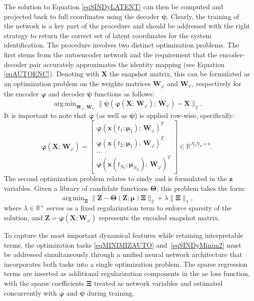 \documentclass[reqno]{amsart}[standalone]
\theoremstyle{definition}
\theoremstyle{remark}
\newcommand{\R}{\mathbb{R}}
\newcommand{\bs}{\boldsymbol}
\DeclareMathOperator*{\argmin}{\arg\,\min}
\begin{document}
The solution to Equation \eqref{eqSINDyLATENT} can then be computed and projected back to full coordinates using the decoder $\bs{\psi}$.
Clearly, the training of the network is a key part of the procedure and should be addressed with the right strategy to return the correct set of latent coordinates for the system identification. The procedure involves two distinct optimization problems. The first stems from the autoencoder network and the requirement that the encoder-decoder pair accurately approximates the identity mapping (see Equation \eqref{eqAUTOENC}). Denoting with $\bs{X}$ the snapshot matrix, this can be formulated as an optimization problem on the weights matrices $\bs{W}_\varphi$ and $\bs{W}_\psi$, respectively for the encoder $\bs{\varphi}$ and decoder $\bs{\psi}$ functions as follows:
\begin{equation}\label{eqMINIMIZAUTO}
\argmin_{\bs{W}_\varphi, \bs{W}_\psi}\| \bs{\psi}\left(\bs{\varphi}(\bs{X};\,\bs{W}_\varphi);\,\bs{W}_\psi\right)-\bs{X}\|_2.
\end{equation}
%
It is important to note that $\bs{\varphi}$ (as well as $\bs{\psi}$) is applied row-wise, specifically:
\begin{equation*}
    \bs{\varphi}(\bs{X};\,\bs{W}_\varphi) =
    \begin{bmatrix}
        \bs{\varphi}(\bs{x}(t_1; \bs{\mu}_1);\, \bs{W}_\varphi)^T \\
        \bs{\varphi}(\bs{x}(t_2; \bs{\mu}_1);\, \bs{W}_\varphi)^T\\
        \dots \\
        \bs{\varphi}(\bs{x}(t_{N_t}; \bs{\mu}_{N_\mu});\,
        \bs{W}_\varphi)^T
   \end{bmatrix}\in\R^{N_tN_\mu\times n}.
\end{equation*}
The second optimization problem relates to \gls{sindy} and is formulated in the $\bs{z}$ variables. Given a library of candidate functions $\bs{\Theta}$, this problem takes the form:
\begin{equation}\label{eqSINDyMinim2}
\argmin_{\bs{\Xi}} \|\dot{\bs{Z}}-\bs{\Theta}(\bs{Z};\bs{\mu})\bs{\Xi}  \|_2 + \lambda \|\bs{\Xi}\|_1,
\end{equation}
where $\lambda\in\R^+$ serves as a fixed regularization term to enforce sparsity of the solution, and $\bs{Z} = \bs{\varphi}(\bs{X}; \bs{W}_\varphi)$ represents the encoded snapshot matrix.

To capture the most important dynamical features while retaining interpretable terms, the optimization tasks \eqref{eqMINIMIZAUTO} and~\eqref{eqSINDyMinim2} must be addressed simultaneously through a unified neural network architecture that incorporates both tasks into a single optimization problem. The sparse regression terms are inserted as additional regularization components in the \gls{ae} loss function, with the sparse coefficients $\bs{\Xi}$ treated as network variables and estimated concurrently with $\bs{\varphi}$ and $\bs{\psi}$ during training.
\end{document}
